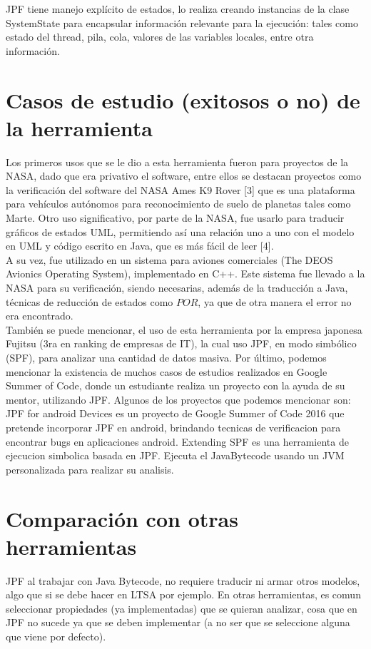 \documentclass[runningheads]{llncs}
\begin{document}
JPF tiene manejo explícito de estados, lo realiza creando instancias de la clase SystemState para encapsular información relevante para la ejecución: tales como estado del thread, pila, cola, valores de las variables locales, entre otra información.


\section{Casos de estudio (exitosos o no) de la herramienta}

Los primeros usos que se le dio a esta herramienta fueron para proyectos de la NASA, dado que era privativo el software, entre ellos se destacan proyectos como la verificación del software del NASA Ames K9 Rover [3] que es una plataforma para vehículos autónomos para reconocimiento de suelo de planetas tales como Marte.
Otro uso significativo, por parte de la NASA, fue usarlo para traducir gráficos de estados UML, permitiendo así una relación uno a uno con el modelo en UML y código escrito en Java, que es más fácil de leer [4].\\
A su vez, fue utilizado en un sistema para aviones comerciales (The DEOS Avionics Operating System), implementado en C++. Este sistema fue llevado a la NASA para su verificación, siendo necesarias, además de la traducción a Java, t\'ecnicas de reducci\'on de estados como $POR$, ya que de otra manera el error no era encontrado.\\
También se puede mencionar, el uso de esta herramienta por la empresa japonesa Fujitsu (3ra en ranking de empresas de IT), la cual uso JPF, en modo simbólico (SPF), para analizar una cantidad de datos masiva.
Por último, podemos mencionar la existencia de muchos casos de estudios realizados en Google Summer of Code, donde un estudiante realiza un proyecto con la ayuda de su mentor, utilizando JPF. Algunos de los proyectos que podemos mencionar son: 
JPF for android Devices es un proyecto de Google Summer of Code 2016 que pretende incorporar JPF en android, brindando tecnicas de verificacion para encontrar bugs en aplicaciones android.
Extending SPF es una herramienta de ejecucion simbolica basada en JPF. Ejecuta el JavaBytecode usando un JVM personalizada para realizar su analisis.


\section{Comparación con otras herramientas}

JPF al trabajar con Java Bytecode, no requiere traducir ni armar otros modelos, algo que si se debe hacer en LTSA por ejemplo. En otras herramientas, es comun seleccionar propiedades (ya implementadas) que se quieran analizar, cosa que en JPF no sucede ya que se deben implementar (a no ser que se seleccione alguna que viene por defecto).
\end{document}

